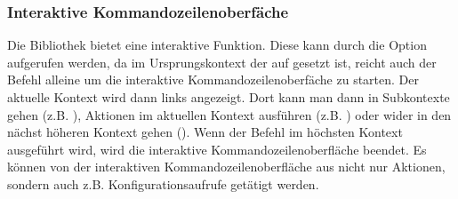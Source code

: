 \subsubsection{Interaktive Kommandozeilenoberfäche}
Die Bibliothek bietet eine interaktive Funktion.
Diese kann durch die  Option aufgerufen werden, da im Ursprungskontext der  auf  gesetzt ist,
reicht auch der  Befehl alleine um die interaktive Kommandozeilenoberfäche zu starten.
Der aktuelle Kontext wird dann links angezeigt.
Dort kann man dann in Subkontexte gehen (z.B. ), Aktionen im aktuellen Kontext ausführen (z.B. )
oder wider in den nächst höheren Kontext gehen ().
Wenn der  Befehl im höchsten Kontext ausgeführt wird, wird die interaktive Kommandozeilenoberfläche beendet.
Es können von der interaktiven Kommandozeilenoberfläche aus nicht nur Aktionen, sondern auch z.B. Konfigurationsaufrufe getätigt werden.
